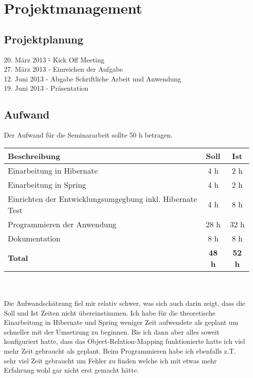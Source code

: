 \chapter{Projektmanagement}
\label{sec:Projektmanagement}

\section{Projektplanung}
\begin{tabbing}
20. März 2013	\= -	\= Kick Off Meeting	\\
27. März 2013	\> -	\> Einreichen der Aufgabe \\
12. Juni 2013	\> -	\> Abgabe Schriftliche Arbeit und Anwendung	\\
19. Juni 2013	\> -	\> Präsentation	\\
\end{tabbing}


\section{Aufwand}
Der Aufwand für die Seminararbeit sollte 50 h betragen. \\

\begin{tabular}{|l|c|c|}
\hline 
\textbf{Beschreibung} & \textbf{Soll}& \textbf{Ist} \\ 
\hline 
Einarbeitung in Hibernate & 4 h & 2 h \\ 
\hline 
Einarbeitung in Spring & 4 h & 2 h \\ 
\hline 
Einrichten der Entwicklungsumgegbung inkl. Hibernate Test & 4 h & 8 h \\ 
\hline 
Programmieren der Anwendung & 28 h & 32 h \\ 
\hline
Dokumentation & 8 h & 8 h \\ 
\hline 
\textbf{Total} & \textbf{48 h} & \textbf{52 h} \\
\hline
\end{tabular}
\\\\
Die Aufwandschätzung fiel mir relativ schwer, was sich auch darin zeigt, dass die Soll und Ist Zeiten nicht übereinstimmen. Ich habe für die theoretische Einarbeitung in Hibernate und Spring weniger Zeit aufwendete als geplant um schneller mit der Umsetzung zu beginnen. Bis ich dann aber alles soweit konfiguriert hatte, dass das Object-Relation-Mapping funktionierte hatte ich viel mehr Zeit gebraucht als geplant. Beim Programmieren habe ich ebenfalls z.T. sehr viel Zeit gebraucht um Fehler zu finden welche ich mit etwas mehr Erfahrung wohl gar nicht erst gemacht hätte.

